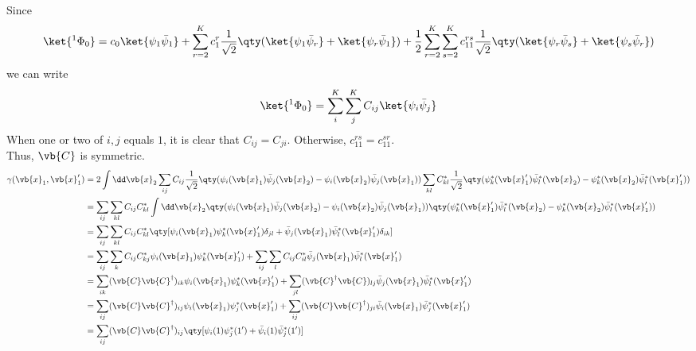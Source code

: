 \documentclass[a4paper]{article}
\begin{document}
Since 
\begin{equation}\label{key}
\ket{^1\Phi_0} = c_0\ket{\psi_1\bar\psi_1} + \sum_{r=2}^K c_1^r \dfrac{1}{\sqrt{2}}\qty(\ket{\psi_1\bar\psi_r} + \ket{\psi_r\bar\psi_1}) + \dfrac{1}{2}\sum_{r=2}^K\sum_{s=2}^K c_{11}^{rs}\dfrac{1}{\sqrt{2}} \qty(\ket{\psi_r\bar\psi_s} + \ket{\psi_s\bar\psi_r})
\end{equation}
we can write
\begin{equation}\label{key}
\ket{^1\Phi_0} = \sum_i^K \sum_j^K C_{ij}\ket{\psi_i\bar\psi_j}
\end{equation}
When one or two of $ i,j $ equals $ 1 $, it is clear that $ C_{ij} = C_{ji} $. Otherwise, $ c_{11}^{rs} = c_{11}^{sr} $. \\
Thus, $ \vb{C} $ is symmetric.
\begin{align}
\gamma(\vb{x}_1,\vb{x}'_1) &= 2\int\dd\vb{x}_2 \sum_{ij} C_{ij} \dfrac{1}{\sqrt{2}} \qty(\psi_i(\vb{x}_1)\bar\psi_j(\vb{x}_2) - \psi_i(\vb{x}_2)\bar\psi_j(\vb{x}_1)) 
\sum_{kl} C^*_{kl} \dfrac{1}{\sqrt{2}} \qty(\psi_k^*(\vb{x}'_1)\bar\psi_l^*(\vb{x}_2) - \psi_k^*(\vb{x}_2)\bar\psi_l^*(\vb{x}'_1)) \notag\\
&= \sum_{ij}\sum_{kl} C_{ij} C^*_{kl} \int\dd\vb{x}_2 \qty(\psi_i(\vb{x}_1)\bar\psi_j(\vb{x}_2) - \psi_i(\vb{x}_2)\bar\psi_j(\vb{x}_1)) 
\qty(\psi_k^*(\vb{x}'_1)\bar\psi_l^*(\vb{x}_2) - \psi_k^*(\vb{x}_2)\bar\psi_l^*(\vb{x}'_1)) \notag\\
&= \sum_{ij}\sum_{kl} C_{ij} C^*_{kl} 
\qty[\psi_i(\vb{x}_1)\psi_k^*(\vb{x}'_1)\delta_{jl}
 + \bar\psi_j(\vb{x}_1)\bar\psi_l^*(\vb{x}'_1)\delta_{ik}
] \notag\\
&= \sum_{ij}\sum_k C_{ij} C^*_{kj} \psi_i(\vb{x}_1)\psi_k^*(\vb{x}'_1)
+ \sum_{ij}\sum_l C_{ij} C^*_{il} \bar\psi_j(\vb{x}_1)\bar\psi_l^*(\vb{x}'_1)
 \notag\\
&= \sum_{ik} (\vb{C}\vb{C}^\dagger)_{ik} \psi_i(\vb{x}_1)\psi_k^*(\vb{x}'_1)
+ \sum_{jl} (\vb{C}^\dagger\vb{C})_{lj} \bar\psi_j(\vb{x}_1)\bar\psi_l^*(\vb{x}'_1)
\notag\\
&= \sum_{ij} (\vb{C}\vb{C}^\dagger)_{ij} \psi_i(\vb{x}_1)\psi_j^*(\vb{x}'_1)
+ \sum_{ij} (\vb{C}\vb{C}^\dagger)_{ji} \bar\psi_i(\vb{x}_1)\bar\psi_j^*(\vb{x}'_1)
\notag\\
&= \sum_{ij} (\vb{C}\vb{C}^\dagger)_{ij} \qty[\psi_i(1)\psi_j^*(1')
+ \bar\psi_i(1)\bar\psi_j^*(1')]
\end{align}
\end{document}
